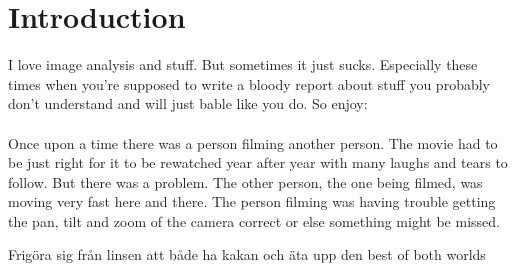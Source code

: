 \section{Introduction}
I love image analysis and stuff. But sometimes it just sucks. Especially these times when you're supposed to write a bloody report about stuff you probably don't understand and will just bable like you do. So enjoy:
\\\\
Once upon a time there was a person filming another person. The movie had to be just right for it to be rewatched year after year with many laughs and tears to follow. But there was a problem. The other person, the one being filmed, was moving very fast here and there. The person filming was having trouble getting the pan, tilt and zoom of the camera correct or else something might be missed.

Frigöra sig från linsen
att både ha kakan och äta upp den
best of both worlds


